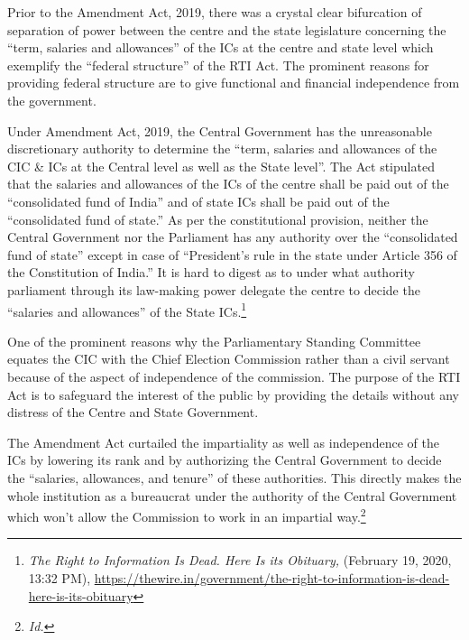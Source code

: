 \begin{multicols}{2}
\noi
Prior to the Amendment Act, 2019, there was a crystal clear bifurcation of separation of
power between the centre and the state legislature concerning the “term, salaries and
allowances” of the ICs at the centre and state level which exemplify the “federal structure” of
the RTI Act. The prominent reasons for providing federal structure are to give functional and
financial independence from the government.

\noi
Under Amendment Act, 2019, the Central Government has the unreasonable discretionary
authority to determine the “term, salaries and allowances of the CIC \& ICs at the Central
level as well as the State level”. The Act stipulated that the salaries and allowances of the ICs
of the centre shall be paid out of the “consolidated fund of India” and of state ICs shall be
paid out of the “consolidated fund of state.” As per the constitutional provision, neither the
Central Government nor the Parliament has any authority over the “consolidated fund of
state” except in case of “President’s rule in the state under Article 356 of the Constitution of
India.” It is hard to digest as to under what authority parliament through its law-making
power delegate the centre to decide the “salaries and allowances” of the State ICs.\footnote{\textit{The Right to Information Is Dead. Here Is its Obituary,} (February 19, 2020, 13:32 PM),
\url{https://thewire.in/government/the-right-to-information-is-dead-here-is-its-obituary}}


\noi
One of the prominent reasons why the Parliamentary Standing Committee equates the CIC
with the Chief Election Commission rather than a civil servant because of the aspect of independence of the commission. The purpose of the RTI Act is to safeguard the interest of
the public by providing the details without any distress of the Centre and State Government.

\noi
The Amendment Act curtailed the impartiality as well as independence of the ICs by
lowering its rank and by authorizing the Central Government to decide the “salaries,
allowances, and tenure” of these authorities. This directly makes the whole institution as a
bureaucrat under the authority of the Central Government which won’t allow the Commission
to work in an impartial way.\footnote{\textit{Id.}}



\end{multicols}
